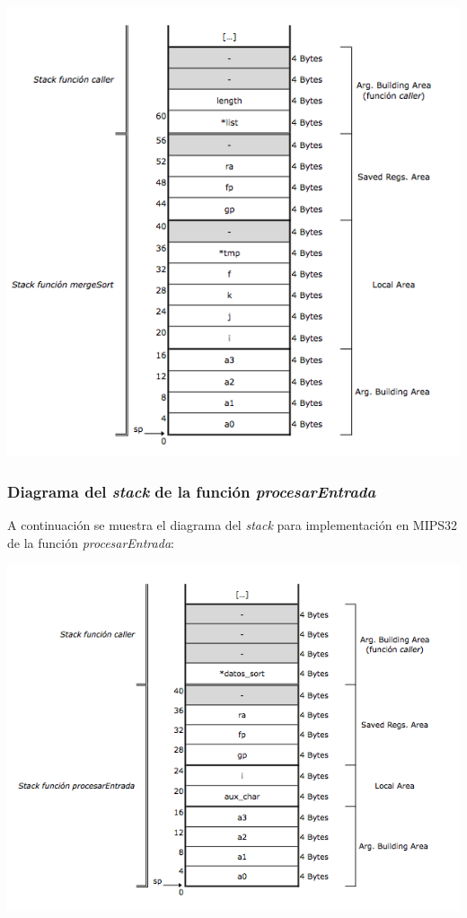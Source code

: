 \documentclass[a4paper,10pt]{article}
\begin{document}
\begin{center}
\includegraphics[scale=0.50]{stack_mergeSort.png}
\end{center}

\pagebreak

\subsubsection{Diagrama del \textit{stack} de la funci\'on \textit{procesarEntrada}}
A continuaci\'on se muestra el diagrama del \textit{stack} para implementaci\'on en MIPS32 de la funci\'on \textit{procesarEntrada}:

\begin{center}
\includegraphics[scale=0.50]{stack_procesarEntrada.png}
\end{center}
\end{document}
